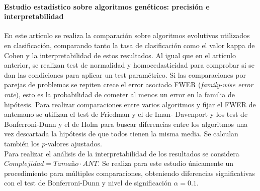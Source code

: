 	\paragraph{Estudio estadístico sobre algoritmos 
genéticos: precisión e interpretabilidad} \cite{Garcia2008} En 
este artículo se realiza la comparación sobre algoritmos 
evolutivos utilizados en clasificación, comparando tanto la 
tasa de clasificación como el valor kappa de Cohen y la 
interpretabilidad de estos resultados. Al igual que en el 
artículo anterior, se realizan test de normalidad y 
homocedasticidad para comprobar si se dan las condiciones 
para aplicar un test paramétrico. Si las comparaciones por 
parejas de problemas se repiten crece el error asociado FWER 
(\textit{family-wise error rate}), esto es la probabilidad de 
cometer al menos un error en la familia de hipótesis. Para realizar 
comparaciones entre varios algoritmos y fijar el FWER de 
antemano se utilizan el test de Friedman y el de Iman-
Davenport y los test de Bonferroni-Dunn y el de Holm para 
buscar diferencias entre los algoritmos una vez descartada la 
hipótesis de que todos tienen la misma media. Se 
calculan también los $p$-valores ajustados.\\
	Para realizar el análisis de la interpretabilidad de los 
resultados se considera $\textit{Complejidad} = 
\textit{Tamaño} \cdot ANT$. Se realiza para este estudio 
únicamente un procedimiento para múltiples comparaciones, 
obteniendo diferencias significativas con el test de 
Bonferroni-Dunn y nivel de significación $\alpha=0.1$.
	
